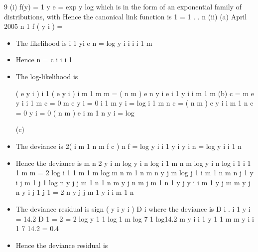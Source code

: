 \documentclass[a4paper,12pt]{article}
\begin{document}
9
(i)
f(y) =
1
y
e
= exp
y
log
which is in the form of an exponential family of distributions, with
Hence the canonical link function is
1
=
1
.
.
n
(ii)
(a)
April 2005
n
1
f ( y i ) =
\begin{itemize}
\item The likelihood is
i 1
yi
e
n
=
log
y i
i
i
i 1
m
\item Hence
n
=
c
i
i
i 1
\item The log-likelihood is

(
e
y i )
i 1
(
e y i )
i m 1
m
m
=
( n m )
e
n
y i
e
i 1
y i
i m 1
m
(b)
c
= m e
y i
i 1
m
c
= 0
m e
y i = 0
i 1
m
y i
= log
i 1
m
n
c
= ( n m ) e
y i
i m 1
n
c
= 0
y i = 0
( n m ) e
i m 1
n
y i
= log

(c)
\item The deviance is 2(
i m 1
n m
f
c )
n
f
=
log y i
i 1
y i
y i
n
=
log y i
i 1
n
\item Hence the deviance is
m
n
2
y i
m
log y i
n
log
i 1
m
n
m
log y i
n
log
i 1
i 1
1
m
m
= 2
log
i 1
1
m
1
m
log
m
n m
1
n m
n
y j
m
log
j 1
i m 1
n m
n
j 1
y i
j m 1
j 1
log
n
y j
j m 1
n
1
n m
y j
n m
j m 1
n
1
y j
y i
i m 1
y j
m
m
y j
n
y i
j 1
j 1
= 2
n
y j
j m 1
y i
i m 1
n
\item The deviance residual is sign ( y i
y i ) D i where the deviance is
D i .
i 1
y i = 14.2
D 1 = 2
= 2
log y 1 1 log
1
m
log 7 1 log14.2
m
y i
i 1
y 1
1
m
m
y i
i 1
7
14.2
= 0.4
\item Hence the deviance residual is
\end{itemize}
\end{document}
